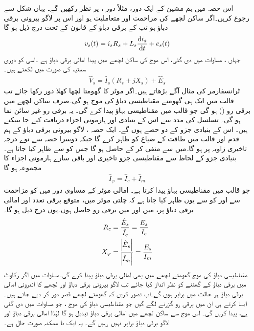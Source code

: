 اس حصہ میں ہم مشین کے ایک دور، مثلاً دور ،  پر نظر رکھیں گے۔ یہاں شکل   سے رجوع کریں۔اگر ساکن لچھے کی مزاحمت  اور متعاملیت  ہو اور اس پر لاگو بیرونی برقی دباؤ  ہو تب  کے برقی دباؤ کے قانون کے تحت درج ذیل ہو گا
\begin{align}
v_s(t)=i_s R_s +L_s \frac{\dif i_s}{\dif t}+e_s(t)
\end{align}
جہاں ،  مساوات   میں دی گئی، اس موج کی ساکن لچھے میں پیدا امالی برقی دباؤ ہے ۔اسی کو دوری سمتیہ کی صورت میں لکھتے ہیں۔
\begin{align}\label{مساوات_امالی_دوری_موٹر_مساوات}
\hat{V}_s=\hat{I}_s \left(R_s+j X_s \right)+\hat{E}_s
\end{align}
ٹرانسفارمر کی مثال آگے بڑھاتے ہیں۔اگر موٹر کا گھومتا لچھا کھلا دور رکھا جائے تب قالب میں ایک ہی گھومتے مقناطیسی دباؤ کی موج  ہو گی۔صرف ساکن لچھے میں برقی رو () ہو گی جو قالب میں مقناطیسی بہاؤ  پیدا کرے گی۔ یہ برقی رو  غیر سائن نما ہو گی۔  تسلسل کی مدد سے اس کے بنیادی  اور ہارمونی اجزاء دریافت کیے جا سکتے ہیں۔ اس کے بنیادی جزو کے دو حصے ہوں گے۔ ایک حصہ  ، لاگو بیرونی برقی دباؤ  کے ہم قدم اور قالب میں طاقت کے ضیاع کو ظاہر کرے گا جبکہ  دوسرا حصہ  سے نوے درجہ تاخیری زاویہ پر ہو گا۔میں سے  منفی کر کے  حاصل ہو گا جس کو   سے ظاہر کیا جاتا ہے۔ بنیادی جزو کے لحاظ سے مقناطیسی جزو  تاخیری   اور باقی سارے ہارمونی اجزاء کا مجموعہ ہو گا
\begin{align}
\hat{I}_\varphi=\hat{I}_c+\hat{I}_m
\end{align}
جو قالب میں مقناطیسی بہاؤ  پیدا کرتا ہے۔ امالی موٹر کے مساوی دور میں  کو مزاحمت  سے اور  کو  سے یوں ظاہر کیا جاتا ہے کہ چلتی موٹر میں، متوقع برقی تعدد  اور امالی برقی دباؤ  پر،   میں  اور  میں  برقی رو حاصل ہوں۔یوں درج ذیل ہو گا۔
\begin{gather}
\begin{aligned}
R_c&=\frac{\hat{E}_s}{\hat{I}_c}=\frac{E_s}{I_c}\\
X_\varphi&=\frac{\abs{\hat{E}_s}}{\abs{\hat{I}_m}}=\frac{E_s}{I_m}
\end{aligned}
\end{gather}
مقناطیسی دباؤ کی موج  گھومتے لچھے میں بھی امالی برقی دباؤ پیدا کرے گی۔مساوات   میں  اگر رکاوٹ میں برقی دباؤ کے گھٹنے کو نظر انداز کیا جائے تب لاگو بیرونی برقی دباؤ اور لچھے کا اندرونی امالی برقی دباؤ ہر حالت میں برابر ہوں گے۔اب تصور کریں کہ گھومتے لچھے قصر دور کر دیے جاتے ہیں۔ ایسا کرتے ہی ان میں برقی رو گزرنے لگے گیں جو مقناطیسی دباؤ کی موج  ، جو مساوات   میں دی گئی ہے،  پیدا کریں گی۔ اس موج سے ساکن لچھے میں امالی برقی دباؤ  تبدیل ہو  گا لہٰذا امالی برقی دباؤ اور  لاگو برقی دباؤ برابر نہیں رہیں گے۔ یہ ایک نا ممکنہ صورت حال ہے۔

